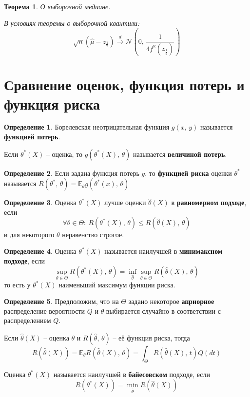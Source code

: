 \documentclass[a4paper,12pt]{article}
\renewcommand{\leq}{\ensuremath{\leqslant}}
\theoremstyle{plain}
\newtheorem{theorem}{Теорема}[section]
\theoremstyle{definition}
\newtheorem{definition}{Определение}[section]
\theoremstyle{remark}
\begin{document}
\begin{theorem}
  О выборочной медиане.

  В условиях теоремы о выборочной квантили:
  \[
    \sqrt{n}(\hat{\mu} - z_{\frac{1}{2}}) \overset{d}{\to} \mathcal{N}\left(0,\, \frac{1}{4f^2(z_{\frac{1}{2}})}\right)
  \]
\end{theorem}

\section{Сравнение оценок, функция потерь и функция риска}
\begin{definition}
  Борелевская неотрицательная функция $g(x,\,y)$ называется \textbf{функцией потерь}.

  Если $\theta^*(X)$ -- оценка, то $g(\theta^*(X),\, \theta)$ называется \textbf{величиной потерь}.
\end{definition}

\begin{definition}
  Если задана функция потерь $g$, то \textbf{функцией риска} оценки $\theta^*$ называется $R(\theta^*,\, \theta) = \mathbb{E}_\theta g(\theta^*(x),\, \theta)$
\end{definition}

\begin{definition}
  Оценка $\theta^*(X)$ лучше оценки $\hat{\theta}(X)$ в \textbf{равномерном подходе}, если 
  \[
    \forall \theta \in \Theta :\: R(\theta^*(X),\, \theta) \leq R(\hat{\theta}(X),\, \theta)
  \]
  и для некоторого $\theta$ неравенство строгое.
\end{definition}

\begin{definition}
  Оценка $\theta^*(X)$ называется наилучшей в \textbf{минимаксном подходе}, если 
  \[
    \sup_{\theta \in \Theta}R(\theta^*(X),\, \theta) = \inf_{\hat{\theta}}\sup_{\theta \in \Theta}R(\hat{\theta}(X),\, \theta)
  \]
  то есть у $\theta^*(X)$ наименьший максимум функции риска.
\end{definition}

\begin{definition}
  Предположим, что на $\Theta$ задано некоторое \textbf{априорное} распределение вероятности $Q$ и $\theta$ выбирается случайно в соответствии с распределением $Q$.

  Если $\hat{\theta}(X)$ -- оценка $\theta$ и $R(\hat{\theta},\, \theta)$ -- её функция риска, тогда 
  \[
    R(\hat{\theta}(X)) = \mathbb{E}_\theta R(\hat{\theta}(X),\, \theta) = \int_\Theta R(\hat{\theta}(X),\, t)Q(dt)
  \]

  Оценка $\theta^*(X)$ называется наилучшей в \textbf{байесовском} подходе, если
  \[
    R(\theta^*(X)) = \min_{\hat{\theta}}R(\hat{\theta}(X))
  \]
\end{definition}
\end{document}
